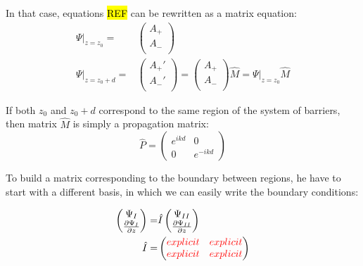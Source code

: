 			In that case, equations \hl{REF} can be rewritten as a matrix equation:
			\begin{align}
				\Psi|_{z=z_{0}} =& 
				\begin{pmatrix}
					A_+ \\
					A_- \\
				\end{pmatrix} \\
				\Psi|_{z=z_{0}+d} =&
				\begin{pmatrix}
					A_+' \\
					A_-' \\
				\end{pmatrix}				
				= \begin{pmatrix}
					A_+ \\
					A_- \\
				\end{pmatrix} \hat{M} = \Psi|_{z=z_{0}} \hat{M}
			\end{align}
			
			If both $z_0$ and $z_0 + d$ correspond to the same region of the system of barriers, then matrix $\hat{M}$ is simply a propagation matrix:
			\begin{equation}
				\hat{P} = \begin{pmatrix}
				e^{ikd} & 0 \\
				0		& e^{-ikd}
				\end{pmatrix}
			\end{equation}
			
			To build a matrix corresponding to the boundary between regions, he have to start with a different basis, in which we can easily write the boundary conditions:
			
			\begin{align}
				\begin{pmatrix}	
					\Psi_{I} \\
					\frac{\partial \Psi_{I}}{\partial z}
				\end{pmatrix} =& 
				\hat{I} \begin{pmatrix}	
					\Psi_{II} \\
					\frac{\partial \Psi_{II}}{\partial z}
				\end{pmatrix} \\
				\hat{I} =& \begin{pmatrix}
					\textcolor{red}{explicit} & \textcolor{red}{explicit} \\
					\textcolor{red}{explicit} & \textcolor{red}{explicit} 					
					\end{pmatrix}
			\end{align}
			
